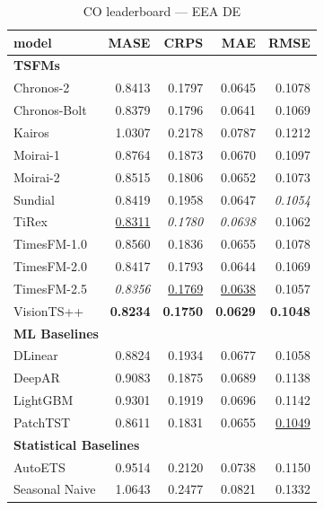 \begin{table}[H]
\caption{CO leaderboard --- EEA DE}
\centering
\begin{small}
\begin{tabular}{lrrrr}
\toprule
model & MASE & CRPS & MAE & RMSE \\
\midrule
\multicolumn{5}{l}{\textbf{TSFMs}} \\
Chronos-2 & 0.8413 & 0.1797 & 0.0645 & 0.1078 \\
Chronos-Bolt & 0.8379 & 0.1796 & 0.0641 & 0.1069 \\
Kairos & 1.0307 & 0.2178 & 0.0787 & 0.1212 \\
Moirai-1 & 0.8764 & 0.1873 & 0.0670 & 0.1097 \\
Moirai-2 & 0.8515 & 0.1806 & 0.0652 & 0.1073 \\
Sundial & 0.8419 & 0.1958 & 0.0647 & \textit{0.1054} \\
TiRex & \underline{0.8311} & \textit{0.1780} & \textit{0.0638} & 0.1062 \\
TimesFM-1.0 & 0.8560 & 0.1836 & 0.0655 & 0.1078 \\
TimesFM-2.0 & 0.8417 & 0.1793 & 0.0644 & 0.1069 \\
TimesFM-2.5 & \textit{0.8356} & \underline{0.1769} & \underline{0.0638} & 0.1057 \\
VisionTS++ & \textbf{0.8234} & \textbf{0.1750} & \textbf{0.0629} & \textbf{0.1048} \\
\midrule
\multicolumn{5}{l}{\textbf{ML Baselines}} \\
DLinear & 0.8824 & 0.1934 & 0.0677 & 0.1058 \\
DeepAR & 0.9083 & 0.1875 & 0.0689 & 0.1138 \\
LightGBM & 0.9301 & 0.1919 & 0.0696 & 0.1142 \\
PatchTST & 0.8611 & 0.1831 & 0.0655 & \underline{0.1049} \\
\midrule
\multicolumn{5}{l}{\textbf{Statistical Baselines}} \\
AutoETS & 0.9514 & 0.2120 & 0.0738 & 0.1150 \\
Seasonal Naive & 1.0643 & 0.2477 & 0.0821 & 0.1332 \\
\bottomrule
\end{tabular}
\end{small}
\end{table}